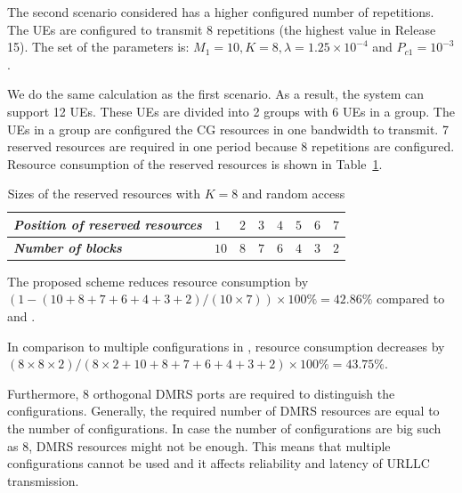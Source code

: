 \documentclass{ieeeaccess}
\begin{document}
The second scenario considered has a higher configured number of repetitions. The UEs are configured to transmit 8 repetitions (the highest value in Release 15). The set of the parameters is: $M_1=10, K=8, \lambda=1.25\times10^{-4}$ and $P_{c1}=10^{-3}$.

We do the same calculation as the first scenario. As a result, the system can support 12 UEs. These UEs are divided into 2 groups with 6 UEs in a group. The UEs in a group are configured the CG resources in one bandwidth to transmit. 7 reserved resources are required in one period because 8 repetitions are configured. Resource consumption of the reserved resources is shown in Table~\ref{tab4}.

\begin{table}[htbp]
\caption{Sizes of the reserved resources with $K=8$ and random access}
\begin{center}
\begin{tabular}{|p{5em}|p{2em}|p{2em}|p{2em}|p{2em}|p{2em}|p{2em}|p{2em}|}
 \hline
 \textbf{\textit{Position of reserved resources}} & $1$ &$2$ &$3$ & $4$ &$5$ &$6$ &$7$\\ 
 \hline
 \textbf{\textit{Number of blocks}} & $10$ &$8$ &$7$ & $6$ &$4$ &$3$ &$2$\\

 
 \hline
\end{tabular}
\label{tab4}
\vspace{-2mm}
\end{center}

\end{table}

The proposed scheme reduces resource consumption by $(1 - (10+8+7+6+4+3+2)/(10\times7)) \times100\% = 42.86\%$ compared to \cite{ref10} and \cite{ref11}.

In comparison to multiple configurations in \cite{ref7}, resource consumption decreases by $(8\times8\times2)/(8\times2+10+8+7+6+4+3+2)\times100\% = 43.75\%$. 

Furthermore, 8 orthogonal DMRS ports are required to distinguish the configurations. Generally, the required number of DMRS resources are equal to the number of configurations. In case the number of configurations are big such as 8, DMRS resources might not be enough. This means that multiple configurations cannot be used and it affects reliability and latency of URLLC transmission.
\end{document}

